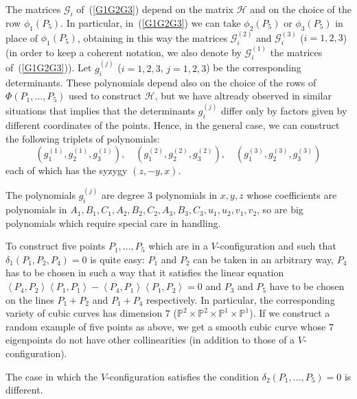 \documentclass[11pt, a4paper, reqno, captions=tableheading,bibliography=totoc]{scrartcl}
\theoremstyle{plain}
\theoremstyle{definition}
\newcommand{\scl}[2]{\left\langle {#1}, {#2} \right\rangle}
\begin{document}
The matrices $\mathcal{G}_i$ of~(\ref{G1G2G3}) depend on the matrix
$\mathcal{H}$ and on the choice of the row $\phi_1(P_5)$. In particular,
in~(\ref{G1G2G3}) we can take $\phi_2(P_5)$ or $\phi_3(P_5)$ in place
of $\phi_1(P_5)$, obtaining in this way the matrices
$\mathcal{G}_i^{(2)}$ and $\mathcal{G}_i^{(3)}$ ($i=1, 2, 3$) (in order
to keep a coherent notation, we also denote by $\mathcal{G}_i^{(1)}$
the matrices of~(\ref{G1G2G3})). Let $g_i^{(j)}$ ($i=1, 2, 3$, $j = 1, 2, 3$)
be the corresponding determinants. These polynomials depend also on
the choice of the rows of $\Phi(P_1, \dots, P_5)$ used to construct
$\mathcal{H}$, but we have altready observed in similar situations that
 implies that the determinants $g_i^{(j)}$
differ only by factors given by different coordinates of the points.
Hence, in the general case, we can construct the following triplets of
polynomials:
\begin{equation}
\left(g_1^{(1)}, g_2^{(1)}, g_3^{(1)}\right),\quad
\left(g_1^{(2)}, g_2^{(2)}, g_3^{(2)}\right),\quad
\left(g_1^{(3)}, g_2^{(3)}, g_3^{(3)}\right)
\label{3tripletsPol}
\end{equation}
each of which has the syzygy $(z, -y, x)$.

The polynomials $g_i^{(j)}$ are degree $3$ polynomials in $x, y, z$ whose
coefficients are polynomials in $A_1, B_1, C_1, A_2, B_2, C_2, A_3, B_3, C_3,
u_1, u_2, v_1, v_2$, so are big polynomials which require
special care in handling.

To construct five points $P_1, \dots, P_5$ which are in a $V$-configuration
and such that $\delta_1(P_1, P_2, P_4)= 0$ is quite easy: $P_1$
and $P_2$ can be taken in an arbitrary way, $P_4$ has to be chosen in such
a way that it satisfies the linear
equation $\scl{P_4}{P_2}\scl{P_1}{P_1}-\scl{P_4}{P_1}\scl{P_1}{P_2} = 0$
and $P_3$ and $P_5$ have to be chosen on the lines $P_1+P_2$ and $P_1+P_4$
respectively. In particular, the corresponding variety of cubic curves
has dimension $7$ ($\mathbb{P}^2\times \mathbb{P}^2 \times
\mathbb{P}^1\times  \mathbb{P}^1$).
If we construct a random example
of five points as above, we get a smooth cubic curve whose $7$ eigenpoints
do not have other collinearities (in addition to those of a
$V$-configuration).

The case in which the $V$-configuration satisfies the condition
$\delta_2(P_1, \dots, P_5) = 0$ is different.
\end{document}
